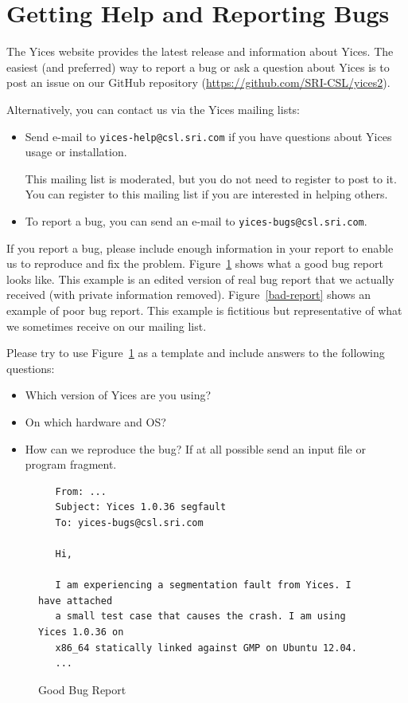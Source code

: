 \documentclass[11pt,twoside,fleqn,openright,titlepage]{cslreport}
\begin{document}
\newpage

\section{Getting Help and Reporting Bugs}

The Yices website provides the latest release and information about
Yices.  The easiest (and preferred) way to report a bug or ask a
question about Yices is to post an issue on our GitHub repository
(\url{https://github.com/SRI-CSL/yices2}).

\medskip\noindent
Alternatively, you can contact us via the Yices mailing lists:
\begin{itemize}
\item Send e-mail to \texttt{yices-help@csl.sri.com} if you have
  questions about Yices usage or installation.

  This mailing list is moderated, but you do not need to register to
  post to it. You can register to this mailing list if you are
  interested in helping others.

\item To report a bug, you can send an e-mail to \texttt{yices-bugs@csl.sri.com}.
\end{itemize}
If you report a bug, please include enough information in your report
to enable us to reproduce and fix the
problem. Figure~\ref{good-report} shows what a good bug report looks
like. This example is an edited version of real bug report that we
actually received (with private information
removed). Figure~\ref{bad-report} shows an example of poor bug
report. This example is fictitious but representative of what we
sometimes receive on our mailing list.

\medskip\noindent
Please try to use Figure~\ref{good-report} as a template and include
answers to the following questions:
\begin{itemize}
\item Which version of Yices are you using?
\item On which hardware and OS?
\item How can we reproduce the bug? If at all possible send an input file
or program fragment.
\end{itemize}


\begin{figure}
\begin{center}
\begin{footnotesize}
\begin{verbatim}
   From: ...
   Subject: Yices 1.0.36 segfault
   To: yices-bugs@csl.sri.com

   Hi,

   I am experiencing a segmentation fault from Yices. I have attached
   a small test case that causes the crash. I am using Yices 1.0.36 on
   x86_64 statically linked against GMP on Ubuntu 12.04.
   ...
\end{verbatim}
\end{footnotesize}
\end{center}
\caption{Good Bug Report}
\label{good-report}
\end{figure}
\end{document}
